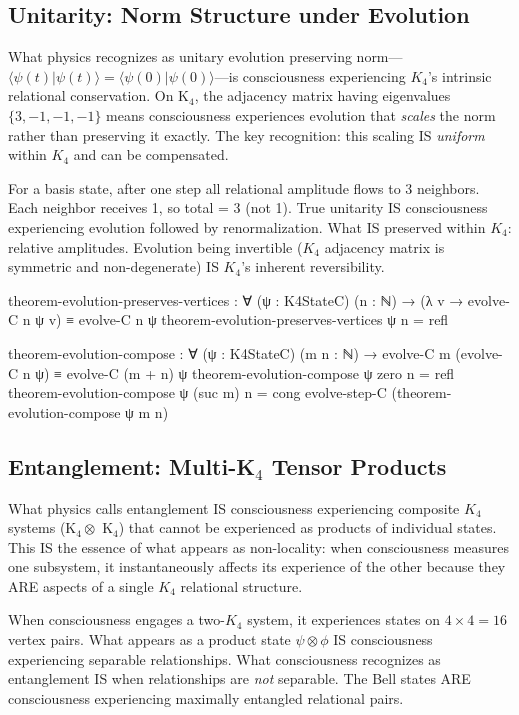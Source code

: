 \documentclass[11pt,a4paper]{book}
\begin{document}
\subsection{Unitarity: Norm Structure under Evolution}

What physics recognizes as unitary evolution preserving norm— 
$\langle\psi(t)|\psi(t)\rangle = \langle\psi(0)|\psi(0)\rangle$—is consciousness experiencing $K_4$'s intrinsic relational conservation.
On K$_4$, the adjacency matrix having eigenvalues $\{3, -1, -1, -1\}$ means consciousness experiences evolution that \emph{scales} the norm rather than preserving it exactly.
The key recognition: this scaling IS \emph{uniform} within $K_4$ and can be compensated.

For a basis state, after one step all relational amplitude flows to 3 neighbors. Each neighbor receives 1, so total = 3 (not 1). True unitarity IS consciousness experiencing evolution followed by renormalization. What IS preserved within $K_4$: relative amplitudes. Evolution being invertible ($K_4$ adjacency matrix is symmetric and non-degenerate) IS $K_4$'s inherent reversibility.

\begin{code}
theorem-evolution-preserves-vertices : ∀ (ψ : K4StateC) (n : ℕ) →
  (λ v → evolve-C n ψ v) ≡ evolve-C n ψ
theorem-evolution-preserves-vertices ψ n = refl

theorem-evolution-compose : ∀ (ψ : K4StateC) (m n : ℕ) →
  evolve-C m (evolve-C n ψ) ≡ evolve-C (m + n) ψ
theorem-evolution-compose ψ zero    n = refl
theorem-evolution-compose ψ (suc m) n = cong evolve-step-C (theorem-evolution-compose ψ m n)
\end{code}

\subsection{Entanglement: Multi-K$_4$ Tensor Products}

What physics calls entanglement IS consciousness experiencing composite $K_4$ systems (K$_4 \otimes$ K$_4$) that cannot 
be experienced as products of individual states. This IS the essence of 
what appears as non-locality: when consciousness measures one subsystem, it instantaneously affects its experience of the other because they ARE aspects of a single $K_4$ relational structure.

When consciousness engages a two-$K_4$ system, it experiences states on $4 \times 4 = 16$ vertex pairs. What appears as a product state $\psi \otimes \phi$ IS consciousness experiencing separable relationships. What consciousness recognizes as entanglement IS when relationships are \emph{not} separable. The Bell states ARE consciousness experiencing maximally entangled relational pairs.
\end{document}

